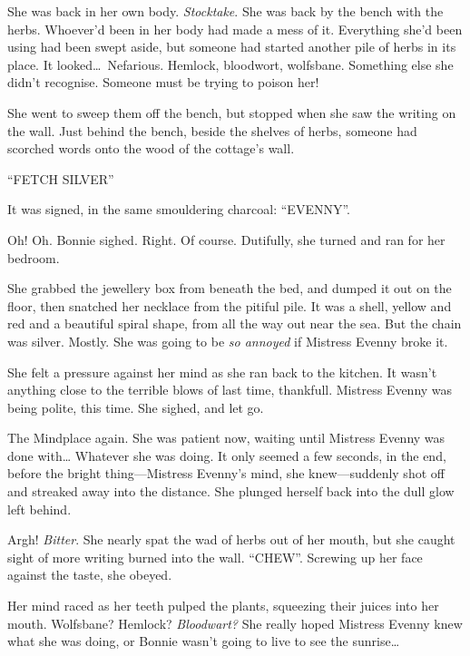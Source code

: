 
She was back in her own body.
\emph{Stocktake}.
She was back by the bench with the herbs.
Whoever'd been in her body had made a mess of it.
Everything she'd been using had been swept aside, but someone had started another pile of herbs in its place.
It looked{\dots}\ Nefarious.
Hemlock, bloodwort, wolfsbane.
Something else she didn't recognise.
Someone must be trying to poison her!

She went to sweep them off the bench, but stopped when she saw the writing on the wall.
Just behind the bench, beside the shelves of herbs, someone had scorched words onto the wood of the cottage's wall.

``FETCH SILVER''

It was signed, in the same smouldering charcoal: ``EVENNY''.

Oh!
Oh.
Bonnie sighed.
Right.
Of course.
Dutifully, she turned and ran for her bedroom.

She grabbed the jewellery box from beneath the bed, and dumped it out on the floor, then snatched her necklace from the pitiful pile.
It was a shell, yellow and red and a beautiful spiral shape, from all the way out near the sea.
But the chain was silver.
Mostly.
She was going to be \emph{so annoyed} if Mistress Evenny broke it.

She felt a pressure against her mind as she ran back to the kitchen.
It wasn't anything close to the terrible blows of last time, thankfull.
Mistress Evenny was being polite, this time.
She sighed, and let go.


The Mindplace again.
She was patient now, waiting until Mistress Evenny was done with{\dots} Whatever she was doing.
It only seemed a few seconds, in the end, before the bright thing---Mistress Evenny's mind, she knew---suddenly shot off and streaked away into the distance.
She plunged herself back into the dull glow left behind.


Argh!
\emph{Bitter}.
She nearly spat the wad of herbs out of her mouth, but she caught sight of more writing burned into the wall.
``CHEW''.
Screwing up her face against the taste, she obeyed.

Her mind raced as her teeth pulped the plants, squeezing their juices into her mouth.
Wolfsbane?
Hemlock?
\emph{Bloodwart?}
She really hoped Mistress Evenny knew what she was doing, or Bonnie wasn't going to live to see the sunrise{\dots}

